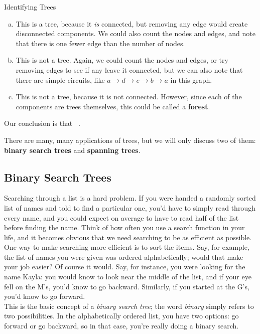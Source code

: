 \begin{example}[https://www.youtube.com/watch?v=NNRIIWfwauE&list=PLfmpjsIzhztst_PxJXo574wshSwxU9Yg_&index=10]{Identifying Trees}
\sol
\begin{enumerate}[(a)]
\item This is a tree, because it \emph{is} connected, but removing any edge would create disconnected components.  We could also count the nodes and edges, and note that there is one fewer edge than the number of nodes.
\item This is not a tree.  Again, we could count the nodes and edges, or try removing edges to see if any leave it connected, but we can also note that there are simple circuits, like $a \to d \to e \to b \to a$ in this graph.
\item This is not a tree, because it is not connected.  However, since each of the components are trees themselves, this could be called a \textbf{forest}.
\end{enumerate}

Our conclusion is that \ .
\end{example}

There are many, many applications of trees, but we will only discuss two of them: \textbf{binary search trees} and \textbf{spanning trees}.
\pagebreak

\subsection{Binary Search Trees}
Searching through a list is a hard problem.  If you were handed a randomly sorted list of names and told to find a particular one, you'd have to simply read through every name, and you could expect on average to have to read half of the list before finding the name.  Think of how often you use a search function in your life, and it becomes obvious that we need searching to be as efficient as possible.\\

One way to make searching more efficient is to sort the items.  Say, for example, the list of names you were given was ordered alphabetically; would that make your job easier?  Of course it would.  Say, for instance, you were looking for the name Kayla: you would know to look near the middle of the list, and if your eye fell on the M's, you'd know to go backward.  Similarly, if you started at the G's, you'd know to go forward.\\

This is the basic concept of a \emph{binary search tree}; the word \emph{binary} simply refers to two possibilities.  In the alphabetically ordered list, you have two options: go forward or go backward, so in that case, you're really doing a binary search.\\

